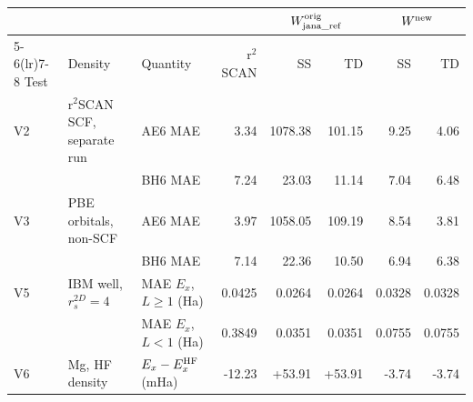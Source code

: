 \begin{tabular}{@{}lll rrrrr@{}}
\toprule
 & & & & \multicolumn{2}{c}{$W^{\rm orig}_{\rm jana\_ref}$} & \multicolumn{2}{c}{$W^{\rm new}$} \\
\cmidrule(lr){5-6}\cmidrule(lr){7-8}
Test & Density & Quantity & r$^2$SCAN & SS & TD & SS & TD \\
\midrule
V2 & r$^2$SCAN SCF, separate run & AE6 MAE & \textcolor{pyscfred}{3.34} & \textcolor{pyscfred}{1078.38} & \textcolor{pyscfred}{101.15} & \textcolor{pyscfred}{9.25} & \textcolor{pyscfred}{4.06} \\
 &  & BH6 MAE & \textcolor{pyscfred}{7.24} & \textcolor{pyscfred}{23.03} & \textcolor{pyscfred}{11.14} & \textcolor{pyscfred}{7.04} & \textcolor{pyscfred}{6.48} \\
\addlinespace
V3 & PBE orbitals, non-SCF & AE6 MAE & \textcolor{pyscfred}{3.97} & \textcolor{pyscfred}{1058.05} & \textcolor{pyscfred}{109.19} & \textcolor{pyscfred}{8.54} & \textcolor{pyscfred}{3.81} \\
 &  & BH6 MAE & \textcolor{pyscfred}{7.14} & \textcolor{pyscfred}{22.36} & \textcolor{pyscfred}{10.50} & \textcolor{pyscfred}{6.94} & \textcolor{pyscfred}{6.38} \\
\addlinespace
V5 & IBM well, $r_s^{2D}=4$ & MAE $E_x$, $L\geq1$ (Ha) & \textcolor{pyscfred}{0.0425} & \textcolor{pyscfred}{0.0264} & \textcolor{pyscfred}{0.0264} & \textcolor{pyscfred}{0.0328} & \textcolor{pyscfred}{0.0328} \\
 &  & MAE $E_x$, $L<1$ (Ha) & \textcolor{pyscfred}{0.3849} & \textcolor{pyscfred}{0.0351} & \textcolor{pyscfred}{0.0351} & \textcolor{pyscfred}{0.0755} & \textcolor{pyscfred}{0.0755} \\
\addlinespace
V6 & Mg, HF density & $E_x-E_x^{\rm HF}$ (mHa) & \textcolor{pyscfred}{-12.23} & \textcolor{pyscfred}{+53.91} & \textcolor{pyscfred}{+53.91} & \textcolor{pyscfred}{-3.74} & \textcolor{pyscfred}{-3.74} \\
\bottomrule
\end{tabular}
